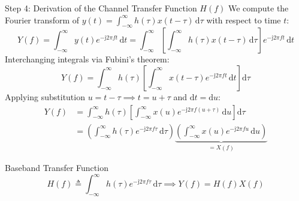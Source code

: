 \documentclass[10pt,aspectratio=169]{beamer}
\newcommand{\dd}{\mathrm{d}}
\newcommand{\jj}{\mathrm{j}}
\begin{document}
\begin{frame}{Step 4: Derivation of the Channel Transfer Function $H(f)$}
\small
  We compute the Fourier transform of $y(t) = \int_{-\infty}^{\infty} h(\tau) x(t - \tau) \,\dd\tau$ with respect to time $t$:
  \begin{equation}
    Y(f) = \int_{-\infty}^{\infty} y(t) e^{-\jj 2\pi f t} \,\dd t = \int_{-\infty}^{\infty} \left[ \int_{-\infty}^{\infty} h(\tau) x(t - \tau) \,\dd\tau \right] e^{-\jj 2\pi f t} \,\dd t
  \end{equation}
  Interchanging integrals via Fubini's theorem:
  \begin{equation}
    Y(f) = \int_{-\infty}^{\infty} h(\tau) \left[ \int_{-\infty}^{\infty} x(t - \tau) e^{-\jj 2\pi f t} \,\dd t \right] \dd\tau
  \end{equation}
  Applying substitution $u = t - \tau \implies t = u + \tau$ and $\dd t = \dd u$:
  \begin{align}
    Y(f) &= \int_{-\infty}^{\infty} h(\tau) \left[ \int_{-\infty}^{\infty} x(u) e^{-\jj 2\pi f (u + \tau)} \,\dd u \right] \dd\tau \nonumber \\
         &= \left( \int_{-\infty}^{\infty} h(\tau) e^{-\jj 2\pi f \tau} \,\dd\tau \right) \underbrace{\left( \int_{-\infty}^{\infty} x(u) e^{-\jj 2\pi f u} \,\dd u \right)}_{= X(f)}
  \end{align}
  \vspace{-1em}
  \begin{block}{Baseband Transfer Function}
    \begin{equation}
      \boxed{H(f) \triangleq \int_{-\infty}^{\infty} h(\tau) e^{-\jj 2\pi f \tau} \,\dd\tau} \implies \boxed{Y(f) = H(f) X(f)}
    \end{equation}
  \end{block}
\end{frame}
\end{document}
